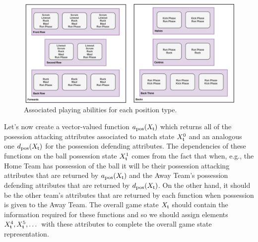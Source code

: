 \begin{figure}[h]
\includegraphics[width=15cm]{images/rugby-player-abilities.drawio.png}
\caption{Associated playing abilities for each position type.}
\label{fig:player-abilities}
\end{figure}

Let's now create a vector-valued function $a_{\rm pos}(X_{\sf t})$ which returns all of the posession attacking attributes associated to match state $X^0_{\sf t}$ and an analogous one $d_{\rm pos}(X_{\sf t})$ for the possession defending attributes. The dependencies of these functions on the ball possession state $X^1_{\sf t}$ comes from the fact that when, e.g., the {\sf Home Team} has possession of the ball it will be their possession attacking attributes that are returned by $a_{\rm pos}(X_{\sf t})$ and the {\sf Away Team}'s possession defending attributes that are returned by $d_{\rm pos}(X_{\sf t})$. On the other hand, it should be the other team's attributes that are returned by each function when possession is given to the {\sf Away Team}. The overall game state $X_{{\sf t}}$ should contain the information required for these functions and so we should assign elements $X^4_{{\sf t}}, X^5_{{\sf t}}, \dots$ with these attributes to complete the overall game state representation.

